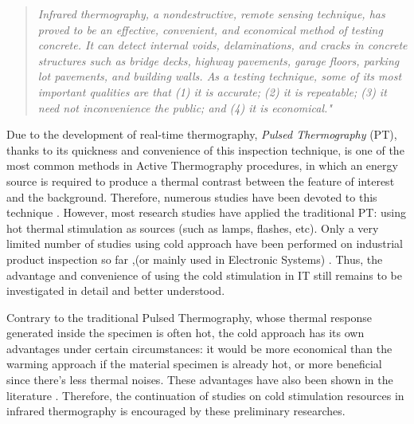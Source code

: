 \begin{quote}
	\textit{	Infrared thermography, a nondestructive, remote sensing technique, has proved to be an effective, convenient, and economical method of testing concrete. It can detect internal voids, delaminations, and cracks in concrete structures such as bridge decks, highway pavements, garage floors, parking lot pavements, and building walls. As a testing technique, some of its most important qualities are that (1) it is accurate; (2) it is repeatable; (3) it need not inconvenience the public; and (4) it is economical."}\citep{malhotra2004handbook}
\end{quote} 

Due to the development of real-time thermography, \textit{Pulsed Thermography} (PT), thanks to its quickness and convenience of this inspection technique, is one of the most common methods in Active Thermography procedures, in which an energy source is required to produce a thermal contrast between the feature of interest and the background.  Therefore, numerous studies have been devoted to this technique \citep{Mayr2011active,Maldague1993Nondestructive,Maldague1994bInfra,Maldague2002intro,Maldague2004Double,2007-Ibarra-Castanedo,2011-ClementeIbarra-Castanedo,2007-ClementeIbarra-Castanedo,shoja2011inspection,duan2013quantitative,vahiddefect2014}. However, most research studies have applied the traditional PT: using hot thermal stimulation as sources (such as lamps, flashes, etc). Only a very limited number of studies using cold approach have been performed on industrial product inspection so far \citep{Maldague1993Nondestructive,Maldague1994bInfra,endohdynamical2012},(or mainly used in Electronic Systems) \citep{2012-LewisHom}. Thus, the advantage and convenience of using the cold stimulation in IT still remains to be investigated in detail and better understood.

Contrary to the traditional Pulsed Thermography, whose thermal response generated inside the specimen is often hot, the cold approach has its own advantages under certain circumstances: it would be more economical than the warming approach if the material specimen is already hot, or more beneficial since there's less thermal noises. These advantages have also been shown in the literature \citep{Maldague1993Nondestructive,Maldague1994bInfra,endohdynamical2012}. Therefore, the continuation of studies on cold stimulation resources in infrared thermography is encouraged by these preliminary researches.